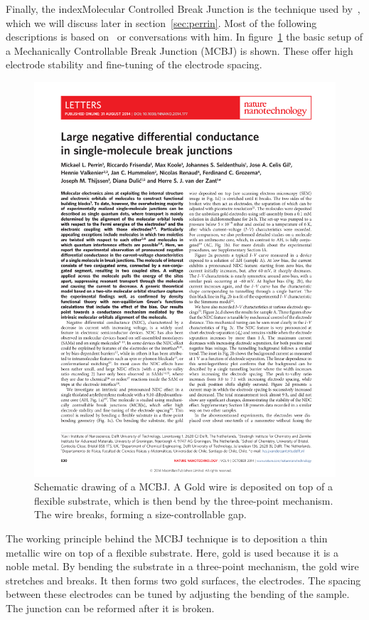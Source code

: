 Finally, the index{Molecular Controlled Break Junction} is the technique used by~\citet{perrinnano}, which we will discuss later in section~\ref{sec:perrin}. Most of the following descriptions is based on~\citet{perrin} or conversations with him. In figure~\ref{fig:mcbj} the basic setup of a Mechanically Controllable Break Junction (MCBJ) is shown. These offer high electrode stability and fine-tuning of the electrode spacing. 
\begin{figure}[!bp]
    \centering
    \includegraphics[height=0.3\textheight,page=2, clip=true, trim=2.5cm 16.5cm 11cm 6cm]{pdf/perrinnnano.pdf}
    \caption{Schematic drawing of a MCBJ. A Gold wire is deposited on top of a flexible substrate, which is then bend by the three-point mechanism. The wire breaks, forming a size-controllable gap.}
    \label{fig:mcbj}
\end{figure}

The working principle behind the MCBJ technique is to deposition a thin metallic wire on top of a flexible substrate. Here, gold is used because it is a noble metal. By bending the substrate in a three-point mechanism, the gold wire stretches and breaks. It then forms two gold surfaces, the electrodes. The spacing between these electrodes can be tuned by adjusting the bending of the sample. The junction can be reformed after it is broken.

